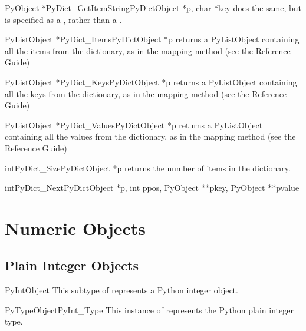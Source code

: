 \documentclass[twoside,openright]{report}
\begin{document}
\begin{cfuncdesc}{PyObject *}{PyDict_GetItemString}{PyDictObject *p, char *key}
does the same, but  is specified as a
, rather than a .
\end{cfuncdesc}

\begin{cfuncdesc}{PyListObject *}{PyDict_Items}{PyDictObject *p}
returns a PyListObject containing all the items 
from the dictionary, as in the mapping method  (see the Reference
Guide)
\end{cfuncdesc}

\begin{cfuncdesc}{PyListObject *}{PyDict_Keys}{PyDictObject *p}
returns a PyListObject containing all the keys 
from the dictionary, as in the mapping method  (see the Reference Guide)
\end{cfuncdesc}

\begin{cfuncdesc}{PyListObject *}{PyDict_Values}{PyDictObject *p}
returns a PyListObject containing all the values 
from the dictionary, as in the mapping method  (see the Reference Guide)
\end{cfuncdesc}

\begin{cfuncdesc}{int}{PyDict_Size}{PyDictObject *p}
returns the number of items in the dictionary.
\end{cfuncdesc}

\begin{cfuncdesc}{int}{PyDict_Next}{PyDictObject *p,
            int ppos,
            PyObject **pkey,
            PyObject **pvalue}

\end{cfuncdesc}


\section{Numeric Objects}

\subsection{Plain Integer Objects}

\begin{ctypedesc}{PyIntObject}
This subtype of  represents a Python integer object.
\end{ctypedesc}

\begin{cvardesc}{PyTypeObject}{PyInt_Type}
This instance of  represents the Python plain 
integer type.
\end{cvardesc}
\end{document}

